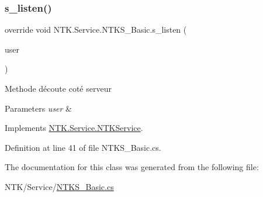 \mbox{\label{class_n_t_k_1_1_service_1_1_n_t_k_s___basic_a1d14f67d95eb73bc1966db7b4d84dc4b}} 
\subsubsection{\texorpdfstring{s\_listen()}{s\_listen()}}
{\footnotesize\ttfamily override void N\+T\+K.\+Service.\+N\+T\+K\+S\+\_\+\+Basic.\+s\+\_\+listen (\begin{DoxyParamCaption}\item[{\mbox{\hyperlink{class_n_t_k_1_1_n_t_k_user}{N\+T\+K\+User}}}]{user }\end{DoxyParamCaption})\hspace{0.3cm}{\ttfamily [virtual]}}



Methode d\textquotesingle{}écoute coté serveur 


\begin{DoxyParams}{Parameters}
{\em user} & \\
\hline
\end{DoxyParams}


Implements \mbox{\hyperlink{class_n_t_k_1_1_service_1_1_n_t_k_service_a7c7cb8c5ddc57bebe6d9784744c976d7}{N\+T\+K.\+Service.\+N\+T\+K\+Service}}.



Definition at line 41 of file N\+T\+K\+S\+\_\+\+Basic.\+cs.



The documentation for this class was generated from the following file\+:\begin{DoxyCompactItemize}
\item 
N\+T\+K/\+Service/\mbox{\hyperlink{_n_t_k_s___basic_8cs}{N\+T\+K\+S\+\_\+\+Basic.\+cs}}\end{DoxyCompactItemize}
